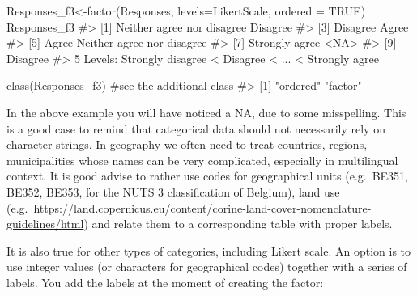 \documentclass[
  letterpaper,
  DIV=11,
  numbers=noendperiod]{scrreprt}
\newenvironment{Shaded}{\begin{snugshade}}{\end{snugshade}}
\newcommand{\AttributeTok}[1]{\textcolor[rgb]{0.40,0.45,0.13}{#1}}
\newcommand{\CommentTok}[1]{\textcolor[rgb]{0.37,0.37,0.37}{#1}}
\newcommand{\ConstantTok}[1]{\textcolor[rgb]{0.56,0.35,0.01}{#1}}
\newcommand{\FunctionTok}[1]{\textcolor[rgb]{0.28,0.35,0.67}{#1}}
\newcommand{\NormalTok}[1]{\textcolor[rgb]{0.00,0.23,0.31}{#1}}
\newcommand{\OtherTok}[1]{\textcolor[rgb]{0.00,0.23,0.31}{#1}}
\begin{document}
\begin{Shaded}
\begin{Highlighting}[]
\NormalTok{Responses\_f3}\OtherTok{\textless{}{-}}\FunctionTok{factor}\NormalTok{(Responses, }\AttributeTok{levels=}\NormalTok{LikertScale, }\AttributeTok{ordered =} \ConstantTok{TRUE}\NormalTok{)}
\NormalTok{Responses\_f3}
\CommentTok{\#\textgreater{} [1] Neither agree nor disagree Disagree                  }
\CommentTok{\#\textgreater{} [3] Disagree                   Agree                     }
\CommentTok{\#\textgreater{} [5] Agree                      Neither agree nor disagree}
\CommentTok{\#\textgreater{} [7] Strongly agree             \textless{}NA\textgreater{}                      }
\CommentTok{\#\textgreater{} [9] Disagree                  }
\CommentTok{\#\textgreater{} 5 Levels: Strongly disagree \textless{} Disagree \textless{} ... \textless{} Strongly agree}

\FunctionTok{class}\NormalTok{(Responses\_f3) }\CommentTok{\#see the additional class}
\CommentTok{\#\textgreater{} [1] "ordered" "factor"}
\end{Highlighting}
\end{Shaded}

In the above example you will have noticed a NA, due to some
misspelling. This is a good case to remind that categorical data should
not necessarily rely on character strings. In geography we often need to
treat countries, regions, municipalities whose names can be very
complicated, especially in multilingual context. It is good advise to
rather use codes for geographical units (e.g.~BE351, BE352, BE353, for
the NUTS 3 classification of Belgium), land use
(e.g.~\url{https://land.copernicus.eu/content/corine-land-cover-nomenclature-guidelines/html})
and relate them to a corresponding table with proper labels.

It is also true for other types of categories, including Likert scale.
An option is to use integer values (or characters for geographical
codes) together with a series of labels. You add the labels at the
moment of creating the factor:
\end{document}
